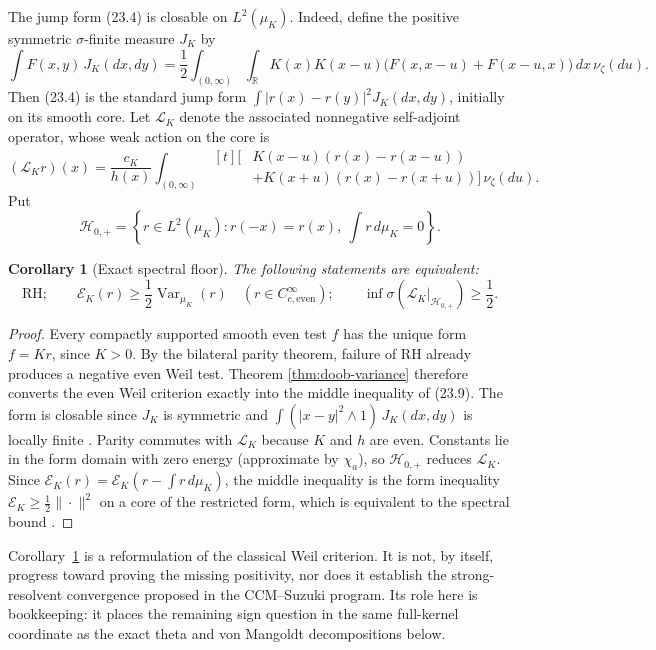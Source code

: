 \documentclass[11pt]{amsart}
\newtheorem{corollary}[theorem]{Corollary}
\theoremstyle{definition}
\theoremstyle{remark}
\begin{document}
The jump form (23.4) is closable on \(L^2(\mu_K)\).  Indeed, define the
positive symmetric \(\sigma\)-finite measure \(J_K\) by
\[
 \int F(x,y)\,J_K(dx,dy)
 =\frac12\int_{(0,\infty)}\!\int_\mathbb R
 K(x)K(x-u)
 \bigl(F(x,x-u)+F(x-u,x)\bigr)\,dx\,\nu_\zeta(du).
\tag{23.7a}
\]
Then (23.4) is the standard jump form
\(\int|r(x)-r(y)|^2J_K(dx,dy)\), initially on its smooth core.
Let
\(\mathcal L_K\) denote the associated nonnegative self-adjoint operator,
whose weak action on the core is
\[
 (\mathcal L_Kr)(x)
 =\frac{c_K}{h(x)}
 \int_{(0,\infty)}
 \begin{aligned}[t]
 \bigl[&K(x-u)(r(x)-r(x-u))\\
       &+K(x+u)(r(x)-r(x+u))\bigr]\,\nu_\zeta(du).
 \end{aligned}
\tag{23.7b}
\]
Put
\[
 \mathcal H_{0,+}
 =\left\{r\in L^2(\mu_K):
 r(-x)=r(x),\ \int r\,d\mu_K=0\right\}.
\tag{23.8}
\]

\begin{corollary}[Exact spectral floor]
\label{cor:exact-spectral-floor}
The following statements are equivalent:
\[
 \mathrm{RH};
 \qquad
 \mathscr E_K(r)\ge\frac12\operatorname{Var}_{\mu_K}(r)
 \quad(r\in C_{c,\mathrm{even}}^\infty);
 \qquad
 \inf\sigma(\mathcal L_K|_{\mathcal H_{0,+}})\ge\frac12.
\tag{23.9}
\]
\end{corollary}

\begin{proof}
Every compactly supported smooth even test \(f\) has the unique form
\(f=Kr\), since \(K>0\).  By the bilateral parity theorem, failure of
RH already produces a negative even Weil test.  Theorem
\ref{thm:doob-variance} therefore converts the even Weil criterion exactly
into the middle inequality of (23.9).  The form is closable since
\(J_K\) is symmetric and \(\int(|x-y|^2\wedge1)\,J_K(dx,dy)\) is locally
finite \cite[Thm.~3.1.1, Example~1.2.4]{FOT}.  Parity commutes with
\(\mathcal L_K\) because \(K\) and \(h\) are even.  Constants lie in the
form domain with zero energy (approximate by \(\chi_a\)), so
\(\mathcal H_{0,+}\) reduces \(\mathcal L_K\).  Since
\(\mathscr E_K(r)=\mathscr E_K(r-\int r\,d\mu_K)\), the middle inequality
is the form inequality \(\mathscr E_K\ge\frac12\|\cdot\|^2\) on a core of
the restricted form, which is equivalent to the spectral bound
\cite[Ch.~VI]{Kato}.
\end{proof}

Corollary~\ref{cor:exact-spectral-floor} is a reformulation of the classical
Weil criterion.  It is not, by itself, progress toward proving the missing
positivity, nor does it establish the strong-resolvent convergence proposed
in the CCM--Suzuki program.  Its role here is bookkeeping: it places the
remaining sign question in the same full-kernel coordinate as the exact
theta and von Mangoldt decompositions below.
\end{document}
